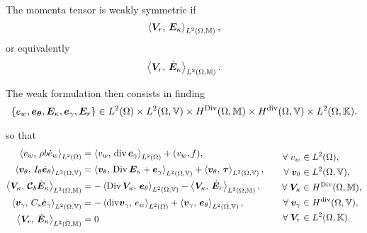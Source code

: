 The momenta tensor is weakly symmetric if 
$$\inner[L^2(\Omega, \mathbb{M})]{\bm{V}_r}{\bm{E}_{\kappa}},$$
or equivalently 
$$\inner[L^2(\Omega, \mathbb{M})]{\bm{V}_r}{\dot{\bm{E}}_{\kappa}}.$$

The weak formulation then consists in finding 
\[
\{e_w, \bm{e}_{\bm{\theta}}, \bm{E}_{\kappa}, \bm{e}_{\gamma}, \bm{E}_{r}\} \in L^2(\Omega) \times L^2(\Omega, \mathbb{V}) \times H^{\Div}(\Omega, \mathbb{M}) \times H^{\div}(\Omega, \mathbb{V}) \times L^2(\Omega, \mathbb{K}).
\]



so that 
\begin{equation}
\label{eq:weak_min_PH_weak}
\begin{aligned}
\inner[L^2(\Omega)]{v_w}{\rho b \dot{e}_w} &= \inner[L^2(\Omega)]{v_w}{\div \bm{e}_\gamma} + (v_w, f), \\ 
\inner[L^2(\Omega, \mathbb{V})]{\bm{v}_\theta}{I_\theta \dot{\bm{e}}_\theta} &= \inner[L^2(\Omega, \mathbb{V})]{\bm{v}_\theta}{\Div \bm{E}_\kappa + \bm{e}_\gamma} + \inner[L^2(\Omega, \mathbb{V})]{\bm{v}_\theta}{\bm{\tau}}, \\  
\inner[L^2(\Omega, \mathbb{M})]{\bm{V}_\kappa}{\bm{\mathcal{C}}_{b} \dot{\bm{E}}_\kappa} &= -\inner[L^2(\Omega, \mathbb{V})]{\Div \bm{V}_\kappa}{\bm{e}_\theta} -  \inner[L^2(\Omega, \mathbb{M})]{\bm{V}_\kappa}{\dot{\bm{E}}_r}, \\ 
\inner[L^2(\Omega, \mathbb{V})]{\bm{v}_\gamma}{C_s \dot{\bm{e}}_\gamma} &= -\inner[L^2(\Omega)]{\mathrm{div} \bm{v}_\gamma}{e_w} + \inner[L^2(\Omega, \mathbb{V})]{\bm{v}_\gamma}{\bm{e}_{\theta}}, \\   
\inner[L^2(\Omega, \mathbb{M})]{\bm{V}_r}{\dot{\bm{E}}_\kappa} &= 0
\end{aligned} \qquad
\begin{aligned}
\forall \;v_w &\in L^2(\Omega), \\
\forall \; \bm{v}_\theta &\in L^2(\Omega, \mathbb{V}), \\
\forall \;\bm{V}_\kappa &\in H^{\Div}(\Omega, \mathbb{M}), \\
\forall \;\bm{v}_\gamma &\in H^{\div}(\Omega, \mathbb{V}), \\
\forall \;\bm{V}_r &\in L^2(\Omega, \mathbb{K}).\\
\end{aligned}
\end{equation}

